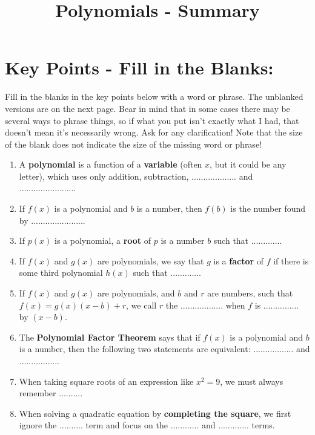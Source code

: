 \documentclass{article}
\begin{document}
\title{Polynomials - Summary}
\date{}

\pagestyle{empty}

\maketitle

\Large

\section{Key Points - Fill in the Blanks:}

Fill in the blanks in the key points below with a word or phrase. The unblanked versions are on the next page. Bear in mind that in some cases there may be several ways to phrase things, so if what you put isn't exactly what I had, that doesn't mean it's necessarily wrong. Ask for any clarification! Note that the size of the blank does not indicate the size of the missing word or phrase!

\begin{enumerate}
\item A {\bf polynomial} is a function of a {\bf variable} (often $x$, but it could be any letter), which uses only addition, subtraction, ................... and ........................
\item If $f(x)$ is a polynomial and $b$ is a number, then $f(b)$ is the number found by .......................
\item If $p(x)$ is a polynomial, a {\bf root} of $p$ is a number $b$ such that .............
\item If $f(x)$ and $g(x)$ are polynomials, we say that $g$ is a {\bf factor} of $f$ if there is some third polynomial $h(x)$ such that .............
\item If $f(x)$ and $g(x)$ are polynomials, and $b$ and $r$ are numbers, such that $f(x)=g(x)(x-b)+r$, we call $r$ the .................. when $f$ is ............... by $(x-b)$.
\item The {\bf Polynomial Factor Theorem} says that if $f(x)$ is a polynomial and $b$ is a number, then the following two statements are equivalent: ................. and .................
\item When taking square roots of an expression like $x^2=9$, we must always remember ..........
\item When solving a quadratic equation by {\bf completing the square}, we first ignore the .......... term and focus on the ............ and ............. terms.
\end{enumerate}
\end{document}
